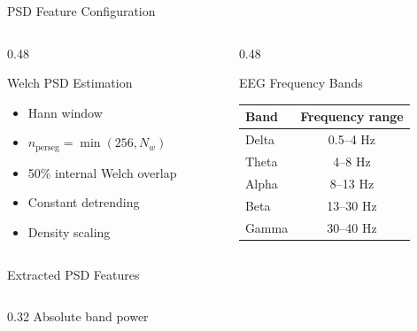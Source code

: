 \documentclass{beamer}
\begin{document}
\begin{frame}{PSD Feature Configuration}

  \begin{columns}[T,onlytextwidth]

    \begin{column}{0.48\textwidth}
      \begin{block}{Welch PSD Estimation}
        \footnotesize
        \begin{itemize}
          \setlength{\itemsep}{0.25em}
          \setlength{\parskip}{0pt}
          \item Hann window
          \item $n_{\mathrm{perseg}}=\min(256,N_w)$
          \item 50\% internal Welch overlap
          \item Constant detrending
          \item Density scaling
        \end{itemize}
      \end{block}
    \end{column}

    \begin{column}{0.48\textwidth}
      \begin{block}{EEG Frequency Bands}
        \centering
        \footnotesize
        \begin{tabular}{lc}
          \toprule
          Band & Frequency range \\
          \midrule
          Delta & 0.5--4 Hz \\
          Theta & 4--8 Hz \\
          Alpha & 8--13 Hz \\
          Beta  & 13--30 Hz \\
          Gamma & 30--40 Hz \\
          \bottomrule
        \end{tabular}
      \end{block}
    \end{column}

  \end{columns}

  \vspace{0.1cm}

  \begin{block}{Extracted PSD Features}
    \footnotesize
    \begin{columns}[T,onlytextwidth]
      \begin{column}{0.32\textwidth}
        \centering
        Absolute band power
      \end{column}


\end{columns}
\end{block}
\end{frame}
\end{document}
